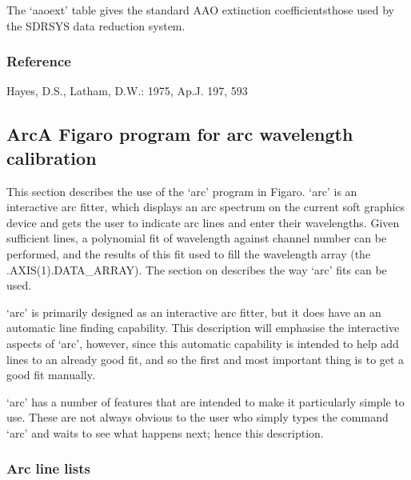    The `aaoext' table gives the standard AAO extinction
   coefficients\latorhtm{---}{-}those used by the SDRSYS data
   reduction system.


\subsubsection{Reference}

Hayes, D.S., Latham, D.W.: 1975, Ap.J. 197, 593


\subsection{\label{techno10}Arc\latorhtm{---}{-}A
   Figaro program for arc wavelength calibration}

   This section describes the use of the `arc' program in Figaro.  
   `arc'
   is an interactive arc fitter, which displays an arc spectrum on the
   current soft graphics device and gets the user to indicate arc lines
   and enter their wavelengths.  Given sufficient lines, a polynomial
   fit of wavelength against channel number can be performed, and the
   results of this fit used to fill the wavelength array (the
   .AXIS(1).DATA\_ARRAY).
   {The section on }
   describes the way `arc' fits can be used.

   `arc' is primarily designed as an interactive arc fitter, but it does
   have an an automatic line finding capability.  This description will
   emphasise the interactive aspects of `arc', however, since this
   automatic capability is intended to help add lines to an already good
   fit, and so the first and most important thing is to get a good fit
   manually.

   `arc' has a number of features that are intended to make it
   particularly simple to use. These are not always obvious to the user
   who simply types the command `arc' and waits to see what happens
   next; hence this description.


\subsubsection{\label{techno10linelist}Arc line lists}

